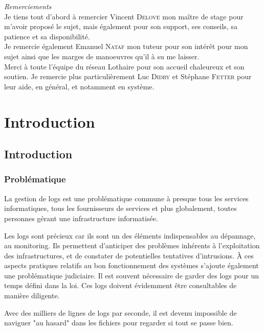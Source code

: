\documentclass[a4paper,12pt,one side,titlepage]{report}
\begin{document}




\emph{\Large Remerciements}
\\[2cm]
Je tiens tout d'abord à remercier Vincent \textsc{Delove} mon maître de stage pour 
m'avoir proposé le sujet, mais également pour son support, ses conseils, sa patience
et sa disponibilité.
\\[2cm]
Je remercie également Emanuel \textsc{Nataf} mon tuteur pour  son intérêt pour mon 
sujet ainsi que les marges de manoeuvres qu'il à su me laisser.
\\[1cm]
Merci à toute l'équipe du réseau Lothaire pour son accueil chaleureux et son soutien.
Je remercie plus particulièrement  Luc \textsc{Didry} et Stéphane \textsc{Fetter} pour leur
aide, en général, et  notamment en système.

\setcounter{tocdepth}{1}
\tableofcontents

\part{Introduction}

\chapter{Introduction}
\section{Problématique}
La gestion de \gls{logs} est une problématique commune à presque tous les services informatiques,
tous les fournisseurs de services et plus globalement, toutes personnes gérant une infrastructure 
informatisée.

Les \gls{logs} sont précieux car ils sont un des éléments indispensables au dépannage, 
au monitoring. Ils permettent d'anticiper des problèmes inhérents à l'exploitation 
des infrastructures, et  de constater de potentielles tentatives d'intrusions.
À ces aspects pratiques relatifs au bon fonctionnement des systèmes s'ajoute également
une problématique judiciaire. Il est souvent nécessaire de garder des logs pour un 
temps défini  dans la loi. Ces logs doivent évidemment être consultables de manière
diligente.

Avec des milliers de lignes de logs par seconde, il est devenu impossible de naviguer
"au hasard" dans les fichiers pour regarder si tout se passe bien.
\end{document}
